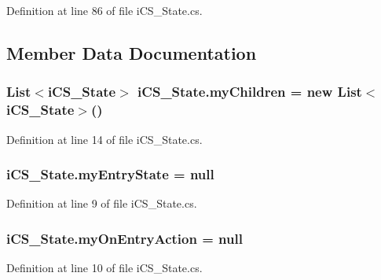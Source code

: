 Definition at line 86 of file i\+C\+S\+\_\+\+State.\+cs.



\subsection{Member Data Documentation}
\hypertarget{classi_c_s___state_a3a6f8c5cd038a625328f2f2bf7db6f16}{
\subsubsection[{my\+Children}]{\setlength{\rightskip}{0pt plus 5cm}List$<${\bf i\+C\+S\+\_\+\+State}$>$ i\+C\+S\+\_\+\+State.\+my\+Children = new List$<${\bf i\+C\+S\+\_\+\+State}$>$()}}\label{classi_c_s___state_a3a6f8c5cd038a625328f2f2bf7db6f16}


Definition at line 14 of file i\+C\+S\+\_\+\+State.\+cs.

\hypertarget{classi_c_s___state_ad8792148c84ea2831437dcc9ace3fb8b}{
\subsubsection[{my\+Entry\+State}]{ i\+C\+S\+\_\+\+State.\+my\+Entry\+State = null}}\label{classi_c_s___state_ad8792148c84ea2831437dcc9ace3fb8b}


Definition at line 9 of file i\+C\+S\+\_\+\+State.\+cs.

\hypertarget{classi_c_s___state_a25795940aed8d4542c48ffdfd70972c5}{
\subsubsection[{my\+On\+Entry\+Action}]{ i\+C\+S\+\_\+\+State.\+my\+On\+Entry\+Action = null}}\label{classi_c_s___state_a25795940aed8d4542c48ffdfd70972c5}


Definition at line 10 of file i\+C\+S\+\_\+\+State.\+cs.

